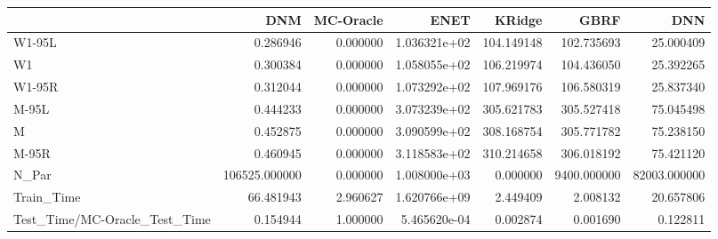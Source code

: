 \begin{tabular}{lrrrrrr}
\toprule
{} &            DNM &  MC-Oracle &          ENET &      KRidge &         GBRF &           DNN \\
\midrule
W1-95L                        &       0.286946 &   0.000000 &  1.036321e+02 &  104.149148 &   102.735693 &     25.000409 \\
W1                            &       0.300384 &   0.000000 &  1.058055e+02 &  106.219974 &   104.436050 &     25.392265 \\
W1-95R                        &       0.312044 &   0.000000 &  1.073292e+02 &  107.969176 &   106.580319 &     25.837340 \\
M-95L                         &       0.444233 &   0.000000 &  3.073239e+02 &  305.621783 &   305.527418 &     75.045498 \\
M                             &       0.452875 &   0.000000 &  3.090599e+02 &  308.168754 &   305.771782 &     75.238150 \\
M-95R                         &       0.460945 &   0.000000 &  3.118583e+02 &  310.214658 &   306.018192 &     75.421120 \\
N\_Par                         &  106525.000000 &   0.000000 &  1.008000e+03 &    0.000000 &  9400.000000 &  82003.000000 \\
Train\_Time                    &      66.481943 &   2.960627 &  1.620766e+09 &    2.449409 &     2.008132 &     20.657806 \\
Test\_Time/MC-Oracle\_Test\_Time &       0.154944 &   1.000000 &  5.465620e-04 &    0.002874 &     0.001690 &      0.122811 \\
\bottomrule
\end{tabular}

